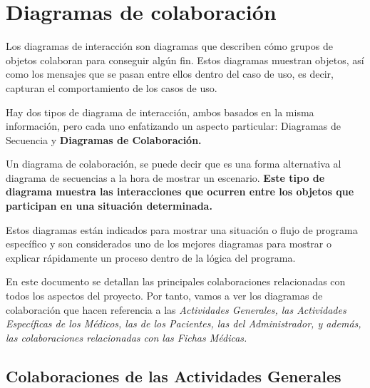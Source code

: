 \section{Diagramas de colaboración} %
\label{sec:diagramas_de_colaboracion}

	Los diagramas de interacción son diagramas que describen cómo grupos de objetos colaboran para conseguir algún fin. Estos diagramas muestran objetos, así como los mensajes que se pasan entre ellos dentro del caso de uso, es decir, capturan el comportamiento de los casos de uso.
	
	Hay dos tipos de diagrama de interacción, ambos basados en la misma información, pero cada uno enfatizando un aspecto particular: Diagramas de Secuencia y \textbf{Diagramas de Colaboración.}

	Un diagrama de colaboración, se puede decir que es una forma alternativa al diagrama de secuencias a la hora de mostrar un escenario. \textbf{Este tipo de diagrama muestra las interacciones que ocurren entre los objetos que participan en una situación determinada.}

	\medskip
	
	
	\medskip
		
	Estos diagramas están indicados para mostrar una situación o flujo de programa específico y son considerados uno de los mejores diagramas para mostrar o explicar rápidamente un proceso dentro de la lógica del programa.
	
	En este documento se detallan las principales colaboraciones relacionadas con todos los aspectos del proyecto. Por tanto, vamos a ver los diagramas de colaboración que hacen referencia a las \textit{Actividades Generales, las Actividades Específicas de los Médicos, las de los Pacientes, las del Administrador, y además, las colaboraciones relacionadas con las Fichas Médicas.}
	
	\newpage
	\subsection{Colaboraciones de las Actividades Generales} %
	\label{sub:colaboraciones_de_las_actividades_generales}
	
